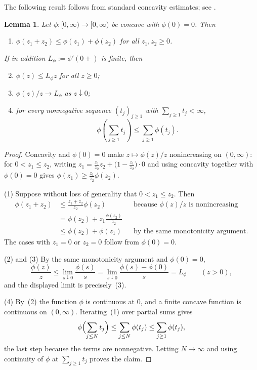 \documentclass[11pt]{amsart}
\newtheorem{lemma}[theorem]{Lemma}
\theoremstyle{definition}
\theoremstyle{remark}
\begin{document}
The following result follows from standard concavity estimates; see \cite{pieper2022nonconvex}.
\begin{lemma}\label{firstorderestimate}
Let $\phi:[0,\infty)\to[0,\infty)$ be concave with
$\phi(0)=0$. Then
\begin{enumerate}
	\item $\phi(z_1+z_2)\le\phi(z_1)+\phi(z_2)$ for all $z_1,z_2\ge0$.
\end{enumerate}
If in addition $L_\phi:=\phi'(0+)$ is finite, then
\begin{enumerate}
	\setcounter{enumi}{1}
	\item $\phi(z)\le L_\phi z$ for all $z\ge0$;
	\item $\phi(z)/z\longrightarrow L_\phi$ as $z\downarrow0$;
	\item for every nonnegative sequence $(t_j)_{j\ge1}$ with
	$\sum_{j\ge1}t_j<\infty$,
	\begin{equation*}
		\phi\left(\sum_{j\ge1}t_j\right)
		\le\sum_{j\ge1}\phi(t_j).
	\end{equation*}
\end{enumerate}
\end{lemma}
\begin{proof}
Concavity and $\phi(0)=0$ make $z\mapsto\phi(z)/z$ nonincreasing on
$(0,\infty)$: for $0<z_1\le z_2$, writing
$z_1=\frac{z_1}{z_2}z_2+\bigl(1-\frac{z_1}{z_2}\bigr)\cdot0$ and using
concavity together with $\phi(0)=0$ gives
$\phi(z_1)\ge\frac{z_1}{z_2}\phi(z_2)$.

(1) Suppose without loss of generality that $0<z_1\le z_2$. Then
\begin{align*}
	\phi(z_1+z_2)
	&\le\frac{z_1+z_2}{z_2}\phi(z_2)
	&&\text{because $\phi(z)/z$ is nonincreasing}\\
	&=\phi(z_2)+z_1\frac{\phi(z_2)}{z_2}\\
	&\le\phi(z_2)+\phi(z_1)
	&&\text{by the same monotonicity argument}.
\end{align*}
The cases with $z_1=0$ or $z_2=0$ follow from $\phi(0)=0$.

(2) and (3) By the same monotonicity argument and $\phi(0)=0$,
\begin{equation*}
	\frac{\phi(z)}z
	\le\lim_{s\downarrow0}\frac{\phi(s)}s
	=\lim_{s\downarrow0}\frac{\phi(s)-\phi(0)}{s}
	=L_\phi
	\qquad(z>0),
\end{equation*}
and the displayed limit is precisely~(3).

(4) By~(2) the function $\phi$ is continuous at $0$, and a finite concave
function is continuous on $(0,\infty)$. Iterating~(1) over partial sums gives
\begin{equation*}
	\phi\Bigl(\sum_{j\le N}t_j\Bigr)
	\le\sum_{j\le N}\phi(t_j)
	\le\sum_{j\ge1}\phi(t_j),
\end{equation*}
the last step because the terms are nonnegative. Letting $N\to\infty$ and
using continuity of $\phi$ at $\sum_{j\ge1}t_j$ proves the claim.
\end{proof}
\end{document}
